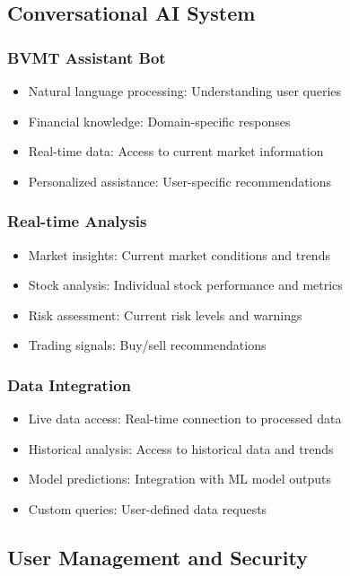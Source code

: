 \documentclass[12pt,a4paper]{article}
\begin{document}
\subsection{Conversational AI System}
\subsubsection{BVMT Assistant Bot}
\begin{itemize}
    \item Natural language processing: Understanding user queries
    \item Financial knowledge: Domain-specific responses
    \item Real-time data: Access to current market information
    \item Personalized assistance: User-specific recommendations
\end{itemize}

\subsubsection{Real-time Analysis}
\begin{itemize}
    \item Market insights: Current market conditions and trends
    \item Stock analysis: Individual stock performance and metrics
    \item Risk assessment: Current risk levels and warnings
    \item Trading signals: Buy/sell recommendations
\end{itemize}

\subsubsection{Data Integration}
\begin{itemize}
    \item Live data access: Real-time connection to processed data
    \item Historical analysis: Access to historical data and trends
    \item Model predictions: Integration with ML model outputs
    \item Custom queries: User-defined data requests
\end{itemize}

\subsection{User Management and Security}
\end{document}
